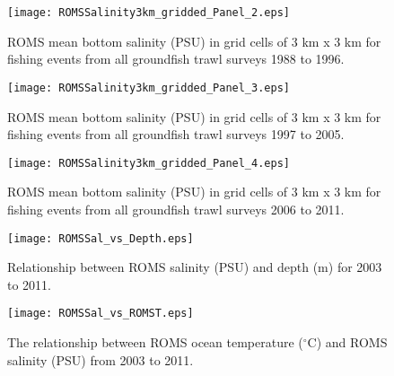 \documentclass[11pt]{book}\usepackage[]{graphicx}\usepackage[]{color}
\begin{document}
\begin{figure}[!htp]
\ContinuedFloat
\begin{center}
\texttt{[image: ROMSSalinity3km\_gridded\_Panel\_2.eps]}
\end{center}

\caption{ROMS mean bottom salinity (PSU) in grid cells of 3 km x 3 km for fishing events from all groundfish trawl surveys 1988 to 1996.}
\label{fig:ROMSsal88to96}
\end{figure}

\newpage

\begin{figure}[!htp]
\ContinuedFloat
\begin{center}
\texttt{[image: ROMSSalinity3km\_gridded\_Panel\_3.eps]}
\end{center}

\caption{ROMS mean bottom salinity (PSU) in grid cells of 3 km x 3 km for fishing events from all groundfish trawl surveys 1997 to 2005.}
\label{fig:ROMSsal97to05}
\end{figure}

\newpage

\begin{figure}[!htp]
\ContinuedFloat
\begin{center}
\texttt{[image: ROMSSalinity3km\_gridded\_Panel\_4.eps]}
\end{center}

\caption{ROMS mean bottom salinity (PSU) in grid cells of 3 km x 3 km for fishing events from all groundfish trawl surveys 2006 to 2011.}
\label{fig:ROMSsal06to11}
\end{figure}


\graphicspath{{c:/GitHub/SPERA-Maps/Results/Figures/}}
\begin{figure}[!htp]
\begin{center}
\texttt{[image: ROMSSal\_vs\_Depth.eps]}
\end{center}
\caption{Relationship between ROMS salinity (PSU) and depth (m) for 2003 to 2011.}
\label{fig:ROMSSal.depth}
\end{figure}


\newpage
\graphicspath{ {c:/GitHub/SPERA-Maps/Results/Figures/} }
\begin{figure}[!htp]
\begin{center}
\texttt{[image: ROMSSal\_vs\_ROMST.eps]}
\end{center}
\caption{The relationship between ROMS ocean temperature ($^\circ$C) and ROMS salinity (PSU) from 2003 to 2011.}
\label{fig:ROMStempSal}
\end{figure}
\end{document}
